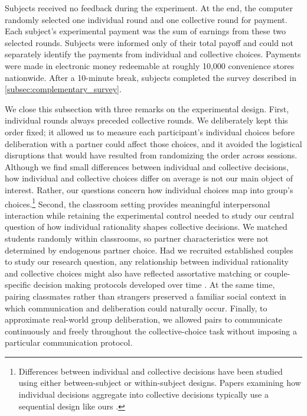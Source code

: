 \documentclass[11 pt]{article}
\begin{document}
Subjects received no feedback during the experiment. At the end, the computer randomly selected one individual round and one collective round for payment. Each subject's experimental payment was the sum of earnings from these two selected rounds. Subjects were informed only of their total payoff and could not separately identify the payments from individual and collective choices. Payments were made in electronic money redeemable at roughly 10,000 convenience stores nationwide. After a 10-minute break, subjects completed the survey described in \autoref{subsec:complementary_survey}.

We close this subsection with three remarks on the experimental design.  First, individual rounds always preceded collective rounds. We deliberately kept this order fixed; it allowed us to measure each participant's individual choices before deliberation with a partner could affect those choices, and it avoided the logistical disruptions that would have resulted from randomizing the order across sessions. Although we find small differences between individual and collective decisions, how individual and collective choices differ on average is not our main object of interest. Rather, our questions concern how individual choices map into group's choices.\footnote{Differences between individual and collective decisions have been studied using either between-subject \citep[e.g.,][]{CooperandKagel:2005:AER, charness2007individual, shupp2007risk} or within-subject \citep[e.g.,][]{masclet2009group, deck2012risk} designs. Papers examining how individual decisions aggregate into collective decisions typically use a sequential design like ours \citep[e.g.,][]{ambrus2015individual, Palmaetal:2011:TD}.}
Second, the classroom setting provides meaningful interpersonal interaction while retaining the experimental control needed to study our central question of how individual rationality shapes collective decisions. We matched students randomly within classrooms, so partner characteristics were not determined by endogenous partner choice. Had we recruited established couples to study our research question, any relationship between individual rationality and collective choices might also have reflected assortative matching or couple-specific decision making protocols developed over time \citep[e.g.,][]{bateman2005experiment, browning2014economics, Palmaetal:2011:TD}. At the same time, pairing classmates rather than strangers preserved a familiar social context in which communication and deliberation could naturally occur. %
Finally, to approximate real-world group deliberation, we allowed pairs to communicate continuously and freely throughout the collective-choice task without imposing a particular communication protocol.
\end{document}
